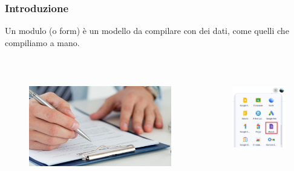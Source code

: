 \documentclass[handout]{beamer}
\begin{document}
\begin{frame}
\frametitle{Introduzione}
Un modulo (o form) è un \alert{modello da compilare con dei dati}, come quelli che compiliamo a mano.

~

\begin{columns}
  \begin{column}{.5\textwidth}
    \begin{figure}
      \includegraphics[width=\columnwidth]{img/compilazionemodulo.jpg}
    \end{figure}
  \end{column}
  \begin{column}{.3\textwidth}
    \begin{figure}
      \includegraphics[width=\columnwidth]{img/moduli.png}
    \end{figure}
  \end{column}
\end{columns}\pause


\end{frame}
\end{document}
